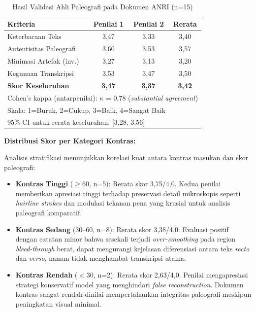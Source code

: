 \documentclass[12pt,a4paper]{article}
\begin{document}
\begin{table}[!t]
\renewcommand{\arraystretch}{1.3}
\caption{Hasil Validasi Ahli Paleografi pada Dokumen ANRI (n=15)}
\label{table:anri_expert_validation}
\centering
\small
\begin{tabular}{|l|c|c|c|}
\hline
\textbf{Kriteria} & \textbf{Penilai 1} & \textbf{Penilai 2} & \textbf{Rerata} \\
\hline
Keterbacaan Teks & 3,47 & 3,33 & 3,40 \\
Autentisitas Paleografi & 3,60 & 3,53 & 3,57 \\
Minimasi Artefak (inv.) & 3,27 & 3,13 & 3,20 \\
Kegunaan Transkripsi & 3,53 & 3,47 & 3,50 \\
\hline
\textbf{Skor Keseluruhan} & \textbf{3,47} & \textbf{3,37} & \textbf{3,42} \\
\hline
\multicolumn{4}{l}{\footnotesize Cohen's kappa (antarpenilai): $\kappa$ = 0,78 (\textit{substantial agreement})} \\
\multicolumn{4}{l}{\footnotesize Skala: 1=Buruk, 2=Cukup, 3=Baik, 4=Sangat Baik} \\
\multicolumn{4}{l}{\footnotesize 95\% CI untuk rerata keseluruhan: [3,28, 3,56]} \\
\end{tabular}
\end{table}

\textbf{Distribusi Skor per Kategori Kontras:}

Analisis stratifikasi menunjukkan korelasi kuat antara kontras masukan dan skor paleografi:

\begin{itemize}[nosep]
    \item \textbf{Kontras Tinggi} ($\geq$60, n=5): Rerata skor 3,75/4,0. Kedua penilai memberikan apresiasi tinggi terhadap preservasi detail mikroskopis seperti \textit{hairline strokes} dan modulasi tekanan pena yang krusial untuk analisis paleografi komparatif.
    
    \item \textbf{Kontras Sedang} (30--60, n=8): Rerata skor 3,38/4,0. Evaluasi positif dengan catatan minor bahwa sesekali terjadi \textit{over-smoothing} pada region \textit{bleed-through} berat, dapat mengurangi kejelasan diferensiasi antara teks \textit{recto} dan \textit{verso}, namun tidak menghambat transkripsi utama.
    
    \item \textbf{Kontras Rendah} ($<$30, n=2): Rerata skor 2,63/4,0. Penilai mengapresiasi strategi konservatif model yang menghindari \textit{false reconstruction}. Dokumen kontras sangat rendah dinilai mempertahankan integritas paleografi meskipun peningkatan visual minimal.
\end{itemize}
\end{document}
